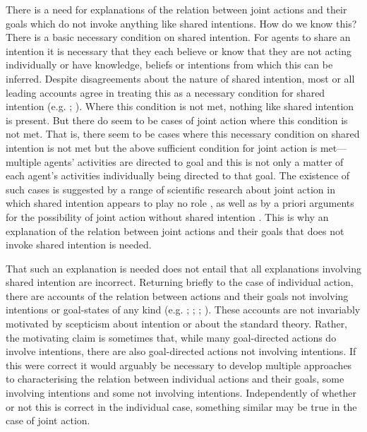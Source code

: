 \documentclass[12pt,a4paper]{extarticle}
\begin{document}
There is a need for explanations of the relation between joint actions and their goals which do not invoke anything like shared intentions.  
How do we know this?
There is a basic necessary condition on shared intention.  
For agents to share an intention it is necessary that they each believe or know that they are not acting individually or have knowledge, beliefs or intentions from which this can be inferred.
Despite disagreements about the nature of shared intention,  most or all leading accounts agree in treating this as a necessary condition for shared intention   
 (e.g. \citealp[p.\ 106]{Bratman:1993je}; \citealp[p.\ 10]{Kutz:2000si}).  
Where this condition is not met, nothing like shared intention is present.
But there do seem to be cases of joint action where this condition is not met.
That is, there seem to be cases where this necessary condition on shared intention is not met but the above sufficient condition for joint action is met---multiple agents' activities are directed to goal and this is not only a matter of each agent's activities individually being directed to that goal.
The existence of such cases is suggested by
a range of scientific research about joint action in which shared intention appears to play no role 
	\citep[as reviewed in][]{%
		vesper_minimal_2010,
		Knoblich:2010fk,
		Sebanz:2006yq%
	},
as well as by a priori arguments for the possibility of joint action without shared intention \citep{petersson_collectivity_2007}.  This is why an explanation of the relation between joint actions and their goals that does not invoke shared intention is needed.

That such an explanation is needed does not entail that all explanations involving shared intention are incorrect.
Returning briefly to the case of individual action, there are accounts of the relation between actions and their goals not involving intentions or goal-states of any kind 
(e.g.
	\citealp{Bennett:1976rg};
	\citealp{Butterfill:2001kc};
	\citealp{Schueler:2003fk};
	\citealp{Taylor:1964tr}).
These accounts are not invariably motivated by scepticism about intention or about the standard theory.  Rather, the motivating claim is sometimes that, while many goal-directed actions do involve intentions, there are also goal-directed actions not involving intentions.  If this were correct it would arguably be necessary to develop multiple approaches to characterising the relation between individual actions and their goals, some involving intentions and some not involving intentions.  Independently of whether or not this is correct in the individual case, something similar may be true in the case of joint action.  
\end{document}
